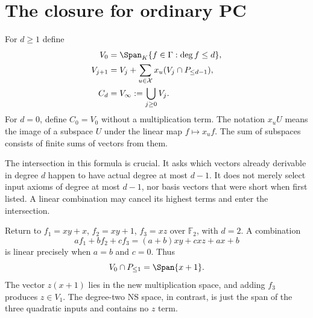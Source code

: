 \section{The closure for ordinary PC}
For $d\ge1$ define
\begin{equation}\label{tx:eq:closure}
 \begin{split}
 V_0&=\Span_K\{f\in\Gamma:\deg f\le d\},\\
 V_{j+1}&=V_j+\sum_{u\in\mathcal X}x_u(V_j\cap P_{\le d-1}),\\
 C_d&=V_\infty:=\bigcup_{j\ge0}V_j.
 \end{split}
\end{equation}
For $d=0$, define $C_0=V_0$ without a multiplication term.
The notation $x_uU$ means the image of a subspace $U$ under the linear
map $f\mapsto x_uf$. The sum of subspaces consists of finite sums of
vectors from them.

The intersection in this formula is crucial. It asks which vectors
already derivable in degree $d$ happen to have actual degree at most
$d-1$. It does not merely select input axioms of degree at most $d-1$,
nor basis vectors that were short when first listed. A linear combination
may cancel its highest terms and enter the intersection.

\begin{example}
Return to $f_1=xy+x$, $f_2=xy+1$, $f_3=xz$ over $\mathbb F_2$, with
$d=2$. A combination
\[
                   af_1+bf_2+cf_3
                  =(a+b)xy+cxz+ax+b
\]
is linear precisely when $a=b$ and $c=0$. Thus
\[
                     V_0\cap P_{\le1}=\Span\{x+1\}.
\]
The vector $z(x+1)$ lies in the new multiplication space, and adding
$f_3$ produces $z\in V_1$. The degree-two NS space, in contrast, is
just the span of the three quadratic inputs and contains no $z$ term.
\end{example}

